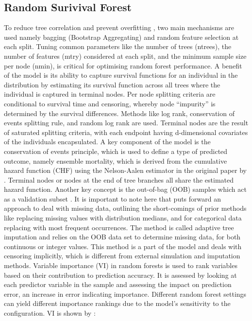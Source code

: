 \subsection{Random Surivival Forest}
\noindent To reduce tree correlation and prevent overfitting \parencite{pham_springer_2023}, two main mechanisms are used namely bagging (Bootstrap Aggregating) and random feature selection at each split. Tuning common parameters like the number of trees (ntrees), the number of features (mtry) considered at each split, and the minimum sample size per node (nmin), is critical for optimising random forest performance. A benefit of the model is its ability to capture survival functions for an individual in the distribution by estimating its survival function across all trees where the individual is captured in terminal nodes. Per node splitting criteria are conditional to survival time and censoring, whereby node “impurity” \parencite{ishwaran_random_2008} is determined by the survival differences. Methods like log rank, conservation of events splitting rule, and random log rank are used. Terminal nodes are the result of saturated splitting criteria, with each endpoint having d-dimensional covariates of the individuals encapsulated. A key component of the model is the conservation of events principle, which is used to define a type of predicted outcome, namely ensemble mortality, which is derived from the cumulative hazard function (CHF) using the Nelson-Aalen estimator in the original paper by \parencite{ishwaran_random_2008}. Terminal nodes or nodes at the end of tree branches all share the estimated hazard function. Another key concept is the out-of-bag (OOB) samples which act as a validation subset \parencite{ishwaran_random_2008}. It is important to note here that \parencite{ishwaran_random_2008} puts forward an approach to deal with missing data, outlining the short-comings of prior methods like replacing missing values with distribution medians, and for categorical data replacing with most frequent occurrences. The method is called adaptive tree imputation and relies on the OOB data set to determine missing data, for both continuous or integer values. This method is a part of the model and deals with censoring implicitly, which is different from external simulation and imputation methods. Variable importance (VI) \parencite{pham_springer_2023} in random forests is used to rank variables based on their contribution to prediction accuracy. It is assessed by looking at each predictor variable in the sample and assessing the impact on prediction error, an increase in error indicating importance. Different random forest settings can yield different importance rankings due to the model's sensitivity to the configuration. VI is shown by \parencite{pham_springer_2023}:
